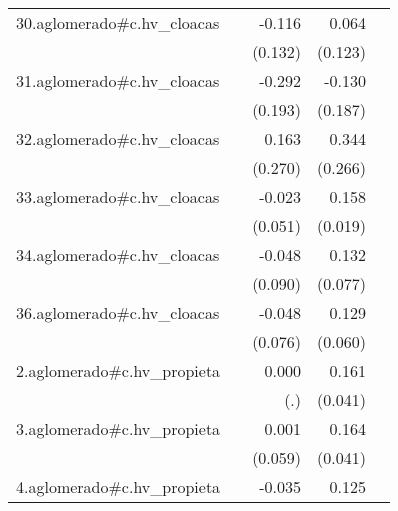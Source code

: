 {\begin{longtable}{l*{4}{D{.}{.}{-1}}}
\addlinespace
30.aglomerado#c.hv\_cloacas&                     &      -0.116         &       0.064         &                     \\
            &                     &     (0.132)         &     (0.123)         &                     \\
\addlinespace
31.aglomerado#c.hv\_cloacas&                     &      -0.292         &      -0.130         &                     \\
            &                     &     (0.193)         &     (0.187)         &                     \\
\addlinespace
32.aglomerado#c.hv\_cloacas&                     &       0.163         &       0.344         &                     \\
            &                     &     (0.270)         &     (0.266)         &                     \\
\addlinespace
33.aglomerado#c.hv\_cloacas&                     &      -0.023         &       0.158\sym{***}&                     \\
            &                     &     (0.051)         &     (0.019)         &                     \\
\addlinespace
34.aglomerado#c.hv\_cloacas&                     &      -0.048         &       0.132         &                     \\
            &                     &     (0.090)         &     (0.077)         &                     \\
\addlinespace
36.aglomerado#c.hv\_cloacas&                     &      -0.048         &       0.129\sym{*}  &                     \\
            &                     &     (0.076)         &     (0.060)         &                     \\
\addlinespace
2.aglomerado#c.hv\_propieta&                     &       0.000         &       0.161\sym{***}&                     \\
            &                     &         (.)         &     (0.041)         &                     \\
\addlinespace
3.aglomerado#c.hv\_propieta&                     &       0.001         &       0.164\sym{***}&                     \\
            &                     &     (0.059)         &     (0.041)         &                     \\
\addlinespace
4.aglomerado#c.hv\_propieta&                     &      -0.035         &       0.125\sym{***}&                     \\

\end{longtable}}
